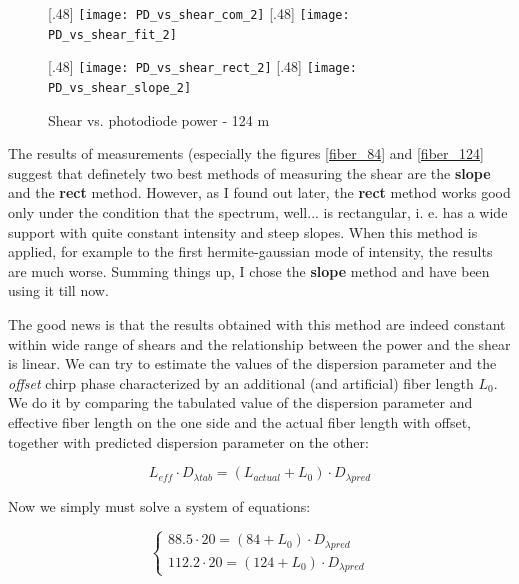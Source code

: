 \documentclass{article}
\begin{document}
\begin{figure}[H]

\caption{Shear vs. photodiode power - 124 m}
[.48\linewidth]{%
\texttt{[image: PD\_vs\_shear\_com\_2]}%
}%
\hfill
{}[.48\linewidth]{%
\texttt{[image: PD\_vs\_shear\_fit\_2]}%
}

\vfill

[.48\linewidth]{%
\texttt{[image: PD\_vs\_shear\_rect\_2]}%
}%
\hfill
{}[.48\linewidth]{%
\texttt{[image: PD\_vs\_shear\_slope\_2]}%
}
\label{photodiode_124}
\end{figure}
 
The results of measurements (especially the figures \ref{fiber_84} and \ref{fiber_124} suggest that definetely two best methods of measuring the shear are the \textbf{slope} and the \textbf{rect} method. However, as I found out later, the \textbf{rect} method works good only under the condition that the spectrum, well... is rectangular, i. e. has a wide support with quite constant intensity and steep slopes. When this method is applied, for example to the first hermite-gaussian mode of intensity, the results are much worse. Summing things up, I chose the \textbf{slope} method and have been using it till now.

The good news is that the results obtained with this method are indeed constant within wide range of shears and the relationship between the power and the shear is linear. We can try to estimate the values of the dispersion parameter and the \emph{offset} chirp phase characterized by an additional (and artificial) fiber length $L_0$. We do it by comparing the tabulated value of the dispersion parameter and effective fiber length on the one side and the actual fiber length with offset, together with predicted dispersion parameter on the other:

\begin{equation}
L_{eff}\cdot D_{\lambda tab}=(L_{actual}+L_0)\cdot D_{\lambda pred}
\end{equation}

Now we simply must solve a system of equations:

\begin{equation}
\left\{\begin{array}{ll}
88.5\cdot 20=(84+L_0)\cdot D_{\lambda pred}\\
112.2\cdot 20=(124+L_0)\cdot D_{\lambda pred}
\end{array}\right.
\end{equation}
\end{document}
